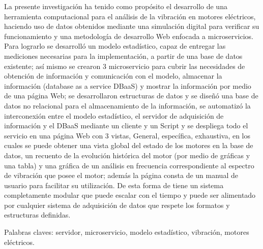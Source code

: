 La presente investigación ha tenido como propósito el desarrollo de una
herramienta computacional para el análisis de la vibración en motores
eléctricos, haciendo uso de  datos obtenidos mediante una simulación
digital para verificar su funcionamiento y una metodología de desarrollo
Web enfocada a microservicios. Para lograrlo se desarrolló un modelo
estadístico, capaz de entregar las mediciones necesarias para la
implementación, a partir de una base de datos existente; así mismo se
crearon 3 microservicio para cubrir las necesidades de obtención de
información y comunicación con el modelo, almacenar la información
(database as a service DBaaS) y mostrar la información por medio de una
página Web; se desarrollaron estructuras de datos y se diseñó una base de
datos no relacional para el almacenamiento de la información, se automatizó
la interconexión entre el modelo estadístico, el servidor de adquisición de
información y el DBaaS mediante un cliente y un Script y se despliega todo
el servicio en una página Web con 3 vistas, General, específica,
exhaustiva, en los cuales se puede obtener una vista global del estado de
los motores en la base de datos, un recuento de la evolución histórica del
motor (por medio de gráficas y una tabla)  y una gráfica de un análisis en
frecuencia correspondiente al espectro de vibración que posee el motor;
además la página consta de un  manual de usuario para facilitar su
utilización. De esta forma de tiene un sistema completamente modular que
puede escalar con el tiempo y puede ser alimentado por cualquier sistema de
adquisición de datos que respete los formatos y estructuras definidas.

Palabras claves: servidor, microservicio, modelo estadístico, vibración,
motores eléctricos.

